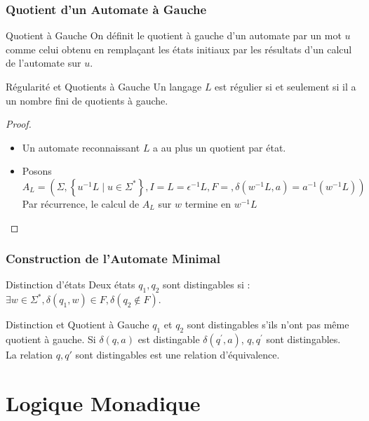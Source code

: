\documentclass{cours}
\begin{document}
\subsubsection{Quotient d'un Automate à Gauche}
\begin{définition}{Quotient à Gauche}{}
    On définit le quotient à gauche d'un automate par un mot $u$ comme celui obtenu en remplaçant les états initiaux par les résultats d'un calcul de l'automate sur $u$.
\end{définition}

\begin{propositionfr}{Régularité et Quotients à Gauche}{}
    Un langage $L$ est régulier si et seulement si il a un nombre fini de quotients à gauche.
\end{propositionfr}

\begin{proof}
    \begin{itemize}
        \item Un automate reconnaissant $L$ a au plus un quotient par état.
        \item Posons $A_{L} = \left(\Sigma, \left\{u^{-1}L \mid u \in \Sigma^{*} \right\}, I = L = \epsilon^{-1}L, F = , \delta(w^{-1}L, a) = a^{-1}(w^{-1}L)\right)$\\
        Par récurrence, le calcul de $A_{L}$ sur $w$ termine en $w^{-1}L$
    \end{itemize}
\end{proof}

\subsubsection{Construction de l'Automate Minimal}
\begin{définition}{Distinction d'états}{}
    Deux états $q_{1}, q_{2}$ sont distingables si : $\exists w \in \Sigma^{*}, \delta(q_{1}, w) \in F, \delta(q_{2} \notin F)$. 
\end{définition}

\begin{propositionfr}{Distinction et Quotient à Gauche}{}
    $q_{1}$ et $q_{2}$ sont distingables s'ils n'ont pas même quotient à gauche. Si $\delta(q, a)$ est distingable $\delta(q^{'}, a)$, $q, q^{'}$ sont distingables.\\
    La relation $q, q'$ sont distingables est une relation d'équivalence. 
\end{propositionfr}

\section{Logique Monadique}
\end{document}
